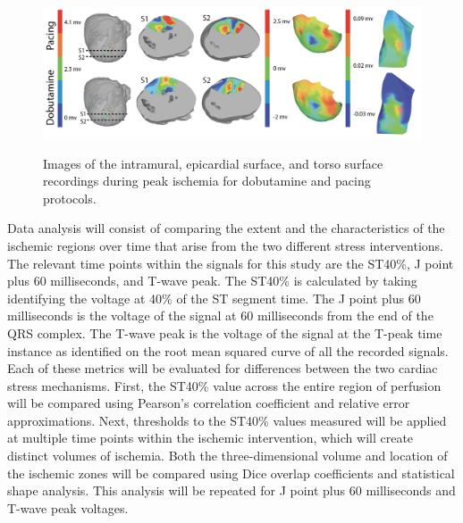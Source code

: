 \begin{figure}[htb]%
    \begin{center}
        {\includegraphics[width=\textwidth]
          {../Figures/fig2.png}}
        \captionsetup{width = \textwidth}
        \caption{\small \label{fig:dobutvspacing} Images of the
          intramural, epicardial surface, and torso surface recordings
          during peak ischemia for dobutamine and pacing protocols.}
    \end{center}
\end{figure}


Data analysis will consist of comparing the extent and the characteristics of the ischemic regions over time that arise from the two different stress interventions. The relevant time points within the signals for this study are the ST40\%, J point plus 60 milliseconds, and T-wave peak. The ST40\% is calculated by taking identifying the voltage at 40\% of the ST segment time. The J point plus 60 milliseconds is the voltage of the signal at 60 milliseconds from the end of the QRS complex. The T-wave peak is the voltage of the signal at the T-peak time instance as identified on the root mean squared curve of all the recorded signals. Each of these metrics will be evaluated for differences between the two cardiac stress mechanisms. First, the ST40\% value across the entire region of perfusion will be compared using Pearson's correlation coefficient and relative error approximations. Next, thresholds to the ST40\% values measured will be applied at multiple time points within the ischemic intervention, which will create distinct volumes of ischemia. Both the three-dimensional volume and location of the ischemic zones will be compared using Dice overlap coefficients and statistical shape analysis. This analysis will be repeated for J point plus 60 milliseconds and T-wave peak voltages. 

